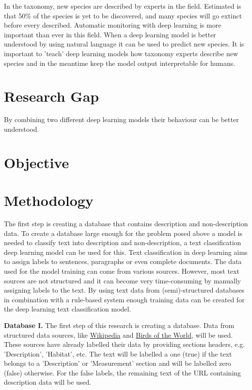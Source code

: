 \documentclass{article}
\begin{document}
In the taxonomy, new species are described by experts in the field. 
Estimated is that 50\% of the species is yet to be discovered, and many species will go extinct before every described.
Automatic monitoring with deep learning is more important than ever in this field.
When a deep learning model is better understood by using natural language it can be used to predict new species.
It is important to 'teach' deep learning models how taxonomy experts describe new species and in the meantime keep the model output interpretable for humans.






\section{Research Gap}
By combining two different deep learning models their behaviour can be better understood.

\section{Objective}

\section{Methodology}
The first step is creating a database that contains description and non-description data.
To create a database large enough for the problem posed above a model is needed to classify text into description and non-description, a text classification deep learning model can be used for this.
Text classification in deep learning aims to assign labels to sentences, paragraphs or even complete documents. 
The data used for the model training can come from various sources. 
However, most text sources are not structured and it can become very time-consuming by manually assigning labels to the text.
By using text data from (semi)-structured databases in combination with a rule-based system enough training data can be created for the deep learning text classification model.
\newline

\noindent
\textbf{Database I.}
The first step of this research is creating a database.
Data from structured data sources, like \href{http://www.Wikipedia.com}{Wikipedia} and \href{https://birdsoftheworld.org}{Birds of the World}, will be used.
These sources have already labelled their data by providing sections headers, e.g. 'Description', 'Habitat', etc.
The text will be labelled a one (true) if the text belongs to a 'Description' or 'Measurement' section and will be labelled zero (false) otherwise.
For the false labels, the remaining text of the URL containing description data will be used.
\newline
\end{document}
